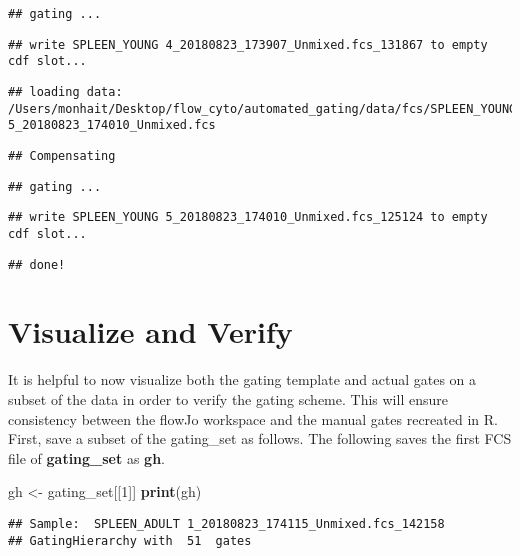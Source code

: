 \documentclass[]{book}
\newenvironment{Shaded}{\begin{snugshade}}{\end{snugshade}}
\newcommand{\DecValTok}[1]{\textcolor[rgb]{0.00,0.00,0.81}{#1}}
\newcommand{\KeywordTok}[1]{\textcolor[rgb]{0.13,0.29,0.53}{\textbf{#1}}}
\newcommand{\NormalTok}[1]{#1}
\newcommand{\StringTok}[1]{\textcolor[rgb]{0.31,0.60,0.02}{#1}}
\begin{document}
\begin{verbatim}
## gating ...
\end{verbatim}

\begin{verbatim}
## write SPLEEN_YOUNG 4_20180823_173907_Unmixed.fcs_131867 to empty cdf slot...
\end{verbatim}

\begin{verbatim}
## loading data: /Users/monhait/Desktop/flow_cyto/automated_gating/data/fcs/SPLEEN_YOUNG 5_20180823_174010_Unmixed.fcs
\end{verbatim}

\begin{verbatim}
## Compensating
\end{verbatim}

\begin{verbatim}
## gating ...
\end{verbatim}

\begin{verbatim}
## write SPLEEN_YOUNG 5_20180823_174010_Unmixed.fcs_125124 to empty cdf slot...
\end{verbatim}

\begin{verbatim}
## done!
\end{verbatim}

\hypertarget{visualize-and-verify}{%
\section{Visualize and Verify}\label{visualize-and-verify}}

It is helpful to now visualize both the gating template and actual gates on a subset of the data in order to verify the gating scheme. This will ensure consistency between the flowJo workspace and the manual gates recreated in R. First, save a subset of the gating\_set as follows. The following saves the first FCS file of \textbf{gating\_set} as \textbf{gh}.

\begin{Shaded}
\begin{Highlighting}[]
\NormalTok{gh <-}\StringTok{ }\NormalTok{gating_set[[}\DecValTok{1}\NormalTok{]]}
\KeywordTok{print}\NormalTok{(gh)}
\end{Highlighting}
\end{Shaded}

\begin{verbatim}
## Sample:  SPLEEN_ADULT 1_20180823_174115_Unmixed.fcs_142158 
## GatingHierarchy with  51  gates
\end{verbatim}
\end{document}
